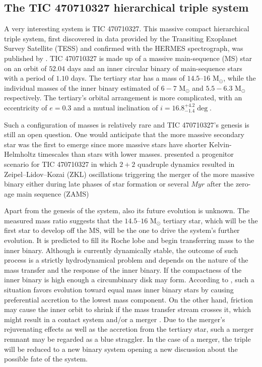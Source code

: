 \subsection{The TIC 470710327 hierarchical triple system}

A very interesting system is TIC 470710327. This massive compact hierarchical triple system, first discovered in data provided by the Transiting Exoplanet Survey Satellite (TESS) and confirmed with the HERMES spectrograph, was published by \cite{eisner2022planet}. TIC 470710327 is made up of a massive main-sequence (MS) star on an orbit of $52.04$ days and an inner circular binary of main-sequence stars with a period of $1.10$ days.  The tertiary star has a mass of $14.5–16$ M$_{\odot}$, while the individual masses of the inner binary estimated of $6-7$ M$_{\odot}$ and $5.5-6.3$ M$_{\odot}$ respectively. The tertiary's orbital arrangement is more complicated, with an eccentricity of $e = 0.3$ and a mutual inclination of $i = 16.8^{+4.2}_{-1.4} \deg$.

Such a configuration of masses is relatively rare \citep{de2014evolution} and TIC 470710327's genesis is still an open question. One would anticipate that the more massive secondary star was the first to emerge since more massive stars have shorter Kelvin-Helmholtz timescales than stars with lower masses. \cite{vigna2022mergers} presented a progenitor scenario for TIC 470710327 in which $2+2$ quadruple dynamics resulted in Zeipel–Lidov–Kozai (ZKL) oscillations triggering the merger of the more massive binary either during late phases of star formation or several $Myr$ after the zero-age main sequence (ZAMS)

Apart from the genesis of the system, also its future evolution is unknown. The measured mass ratio suggests that the $14.5–16$ M$_{\odot}$ tertiary star, which will be the first star to develop off the MS, will be the one to drive the system's further evolution. It is predicted to fill its Roche lobe and begin transferring mass to the inner binary. Although is currently dynamically stable, the outcome of such process is a strictly hydrodynamical problem \citep{de2014evolution} and depends on the nature of the mass transfer and the response of the inner binary. If the compactness of the inner binary is high enough a circumbinary disk may form. According to \cite{leigh2020mergers}, such a situation favors evolution toward equal mass inner binary stars by causing preferential accretion to the lowest mass component. On the other hand, friction may cause the inner orbit to shrink if the mass transfer stream crosses it, which might result in a contact system and/or a merger \citep{de2014evolution}. Due to the merger's rejuvenating effects as well as the accretion from the tertiary star, such a merger remnant may be regarded as a blue straggler. In the case of a merger, the triple will be reduced to a new binary system opening a new discussion about the possible fate of the system.


